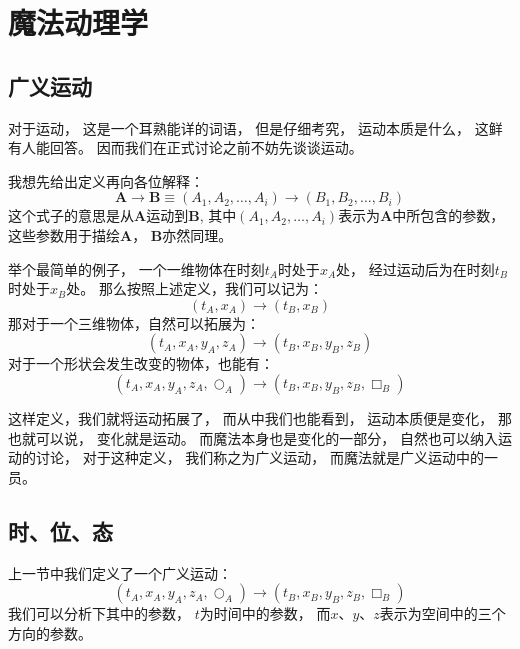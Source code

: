 \documentclass[UTF8,12pt]{ctexart}
\begin{document}
    \section{魔法动理学}
        \subsection{广义运动}
            对于运动，
            这是一个耳熟能详的词语，
            但是仔细考究，
            运动本质是什么，
            这鲜有人能回答。
            因而我们在正式讨论之前不妨先谈谈运动。

            我想先给出定义再向各位解释：
            \begin{equation}
                \textbf{A}\rightarrow \textbf{B}\equiv (A_1,A_2,\dots,A_i)\rightarrow(B_1,B_2,\dots,B_i)
            \end{equation}
            这个式子的意思是从$\textbf{A}$运动到$\textbf{B}$,
            其中$(A_1,A_2,\dots,A_i)$表示为$\textbf{A}$中所包含的参数，
            这些参数用于描绘$\textbf{A}$，
            $\textbf{B}$亦然同理。

            举个最简单的例子，
            一个一维物体在时刻$t_A$时处于$x_A$处，
            经过运动后为在时刻$t_B$时处于$x_B$处。
            那么按照上述定义，我们可以记为：
            \begin{equation}
                (t_A,x_A)\rightarrow(t_B,x_B)
            \end{equation}
            那对于一个三维物体，自然可以拓展为：
            \begin{equation}
                (t_A,x_A,y_A,z_A)\rightarrow(t_B,x_B,y_B,z_B)
            \end{equation}
            对于一个形状会发生改变的物体，也能有：
            \begin{equation}
                (t_A,x_A,y_A,z_A,\bigcirc _A)\rightarrow(t_B,x_B,y_B,z_B,\Box _B)
            \end{equation}

            这样定义，我们就将运动拓展了，
            而从中我们也能看到，
            运动本质便是变化，
            那也就可以说，
            变化就是运动。
            而魔法本身也是变化的一部分，
            自然也可以纳入运动的讨论，
            对于这种定义，
            我们称之为广义运动，
            而魔法就是广义运动中的一员。

        \subsection{时、位、态}
            上一节中我们定义了一个广义运动：
            \begin{equation}
                (t_A,x_A,y_A,z_A,\bigcirc _A)\rightarrow(t_B,x_B,y_B,z_B,\Box _B)
            \end{equation}
            我们可以分析下其中的参数，
            $t$为时间中的参数，
            而$x$、$y$、$z$表示为空间中的三个方向的参数。
\end{document}
